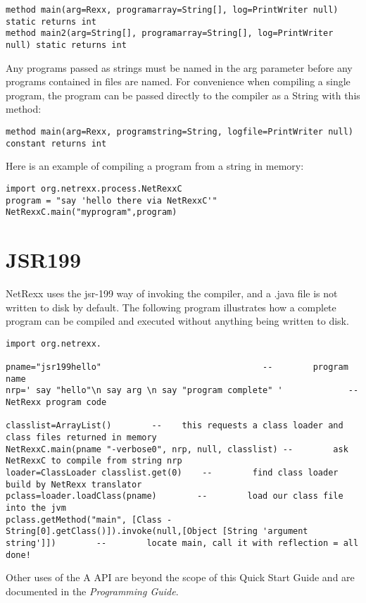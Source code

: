 \begin{lstlisting}[label=frommemory,caption=From Memory]
method main(arg=Rexx, programarray=String[], log=PrintWriter null) static returns int
method main2(arg=String[], programarray=String[], log=PrintWriter null) static returns int
\end{lstlisting}

Any programs passed as strings must be named in the arg parameter before any programs contained in files are named.
For convenience when compiling a single program, the program can be
passed directly to the compiler as a String with this method:

\begin{lstlisting}[label=string,caption=With String argument]
method main(arg=Rexx, programstring=String, logfile=PrintWriter null) constant returns int
\end{lstlisting}

Here is an example of compiling a \nr{} program from a string in
memory:

\begin{lstlisting}[label=memexample,caption=Example of compiling from String]
import org.netrexx.process.NetRexxC
program = "say 'hello there via NetRexxC'"
NetRexxC.main("myprogram",program)
\end{lstlisting}


\section{JSR199}
NetRexx uses the jsr-199 way of invoking the compiler, and a .java
file is not written to disk by default.  The following program
illustrates how a complete program can be compiled and executed
without anything being written to disk.

\begin{lstlisting}[label=jsr199,caption=JSR199 example]
import org.netrexx.

pname="jsr199hello"                                --        program name
nrp=' say "hello"\n say arg \n say "program complete" '             --        NetRexx program code

classlist=ArrayList()        --    this requests a class loader and class files returned in memory
NetRexxC.main(pname "-verbose0", nrp, null, classlist) --        ask NetRexxC to compile from string nrp
loader=ClassLoader classlist.get(0)    --        find class loader build by NetRexx translator
pclass=loader.loadClass(pname)        --        load our class file into the jvm
pclass.getMethod("main", [Class -
String[0].getClass()]).invoke(null,[Object [String 'argument
string']])        --        locate main, call it with reflection = all done!
\end{lstlisting}

Other uses of the \nr{}A API are beyond the scope
of this Quick Start Guide and are documented in the \emph{Programming Guide}.